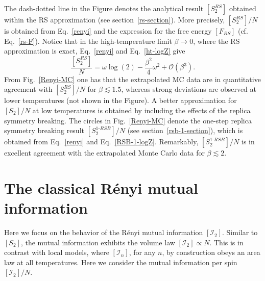 \documentclass[twocolumn,superscriptaddress,prb,10pt]{revtex4-1}
\begin{document}
The dash-dotted line in the Figure denotes the analytical result $[S_2^{RS}]$ obtained within 
the RS approximation (see section~\ref{rs-section}). More precisely, $[S_2^{RS}]/N$ is obtained 
from Eq.~\eqref{renyi} and the expression for the free energy $[F_{RS}]$ (cf. Eq.~\eqref{rs-F}). 
Notice that in the high-temperature limit $\beta\to0$, where the RS approximation is exact, 
Eq.~\eqref{renyi} and Eq.~\eqref{ht-logZ} give 
%
\begin{equation}
\frac{[S^{RS}_2]}{N}=\omega\log(2)-\frac{\beta^2}{4}\omega^2+{\mathcal O}(\beta^3).
\end{equation}
%
From Fig.~\ref{Renyi-MC} one has that the extrapolated MC data are in quantitative 
agreement with $[S_2^{RS}]/N$ for $\beta\lesssim 1.5$, whereas strong deviations are 
observed at lower temperatures (not shown in the Figure). A better approximation for 
$[S_2]/N$ at low temperatures is obtained by including the effects of the replica 
symmetry breaking. The circles in Fig.~\ref{Renyi-MC} denote the one-step replica 
symmetry breaking result $[S_2^{1\textrm{-}RSB}]/N$ (see section~\ref{rsb-1-section}), 
which is obtained from Eq.~\eqref{renyi}  and Eq.~\eqref{RSB-1-logZ}. Remarkably, 
$[S_2^{1\textrm{-}RSB}]/N$ is in excellent agreement with the extrapolated Monte Carlo 
data for $\beta\lesssim 2$. 


\section{The classical R\'enyi mutual information}
\label{I2-section}

Here we focus on the behavior of the R\'enyi mutual information $[{\mathcal I}_2]$. 
Similar to $[S_2]$, the mutual information exhibits the volume law $[{\mathcal I}_2]
\propto N$. This is in contrast with local models, where $[{\mathcal I}_n]$, for any 
$n$, by construction obeys an area law at all temperatures. Here we consider the 
mutual information per spin $[{\mathcal I}_2]/N$. 
\end{document}
